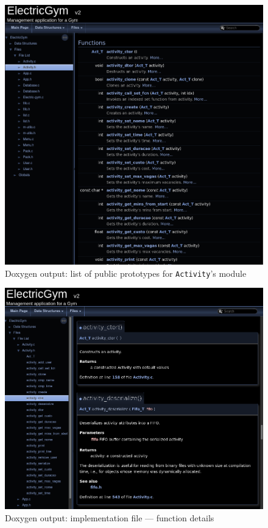 \begin{figure}[htb!]
\centering
    \includegraphics[width=0.8\columnwidth]{./img/doxygen-out5.png}
  \caption{Doxygen output: list of public prototypes for \texttt{Activity}'s module}%
\label{fig:doxygen-out5}
\end{figure}
%
\begin{figure}[htb!]
\centering
    \includegraphics[width=0.8\columnwidth]{./img/doxygen-out6.png}
  \caption{Doxygen output: implementation file --- function details}%
\label{fig:doxygen-out6}
\end{figure}


